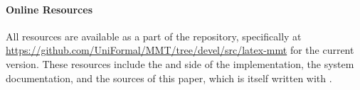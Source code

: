%

%

\paragraph{Online Resources}
All resources are available as a part of the \mmt repository, specifically at \url{https://github.com/UniFormal/MMT/tree/devel/src/latex-mmt} for the current version.
These resources include the \mmt and \latex side of the implementation, the system documentation, and the sources of this paper, which is itself written with \mmttex.

